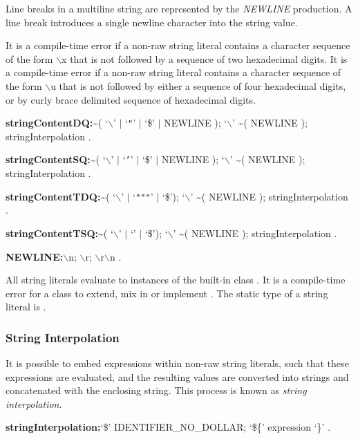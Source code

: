 \documentclass{article}
\begin{document}
\LMHash{}
Line breaks in a multiline string are represented by the {\em NEWLINE} production.
A line break introduces a single newline character into the string value.

\LMHash{}
It is a compile-time error if a non-raw string literal contains a character sequence of the form $\backslash$x that is not followed by a sequence of two hexadecimal digits.
It is a compile-time error if a non-raw string literal contains a character sequence of the form $\backslash$u that is not followed by either a sequence of four hexadecimal digits, or by curly brace delimited sequence of hexadecimal digits.

\begin{grammar}
{\bf stringContentDQ:}\~{}( `$\backslash$' $|$ `{\escapegrammar \texttt{"}}' $|$ `\$' $|$ NEWLINE );
  `$\backslash$' \~{}( NEWLINE );
  stringInterpolation
  .

{\bf stringContentSQ:}\~{}( `$\backslash$' $|$ `{\escapegrammar \texttt{'}}' $|$ `\$' $|$ NEWLINE );
  `$\backslash$' \~{}( NEWLINE );
  stringInterpolation
  .

{\bf stringContentTDQ:}\~{}( `$\backslash$' $|$ `{\escapegrammar \texttt{"""}}' $|$ `\$');
  `$\backslash$' \~{}( NEWLINE );
  stringInterpolation
  .

{\bf stringContentTSQ:}\~{}( `$\backslash$' $|$ `{\escapegrammar {}}' $|$ `\$');
  `$\backslash$' \~{}( NEWLINE );
  stringInterpolation
  .

{\bf NEWLINE:}$\backslash$n;
  $\backslash$r;
  $\backslash$r$\backslash$n
  .
\end{grammar}

\LMHash{}
All string literals evaluate to instances of the built-in class .
It is a compile-time error for a class to extend, mix in or implement .
The static type of a string literal is .


\subsubsection{String Interpolation}

\LMHash{}
It is possible to embed expressions within non-raw string literals, such that these expressions are evaluated, and the resulting values are converted into strings and concatenated with the enclosing string.
This process is known as {\em string interpolation}.

\begin{grammar}
{\bf stringInterpolation:}`\$' IDENTIFIER\_NO\_DOLLAR;
  `\$\{' expression `\}'
  .
\end{grammar}
\end{document}
